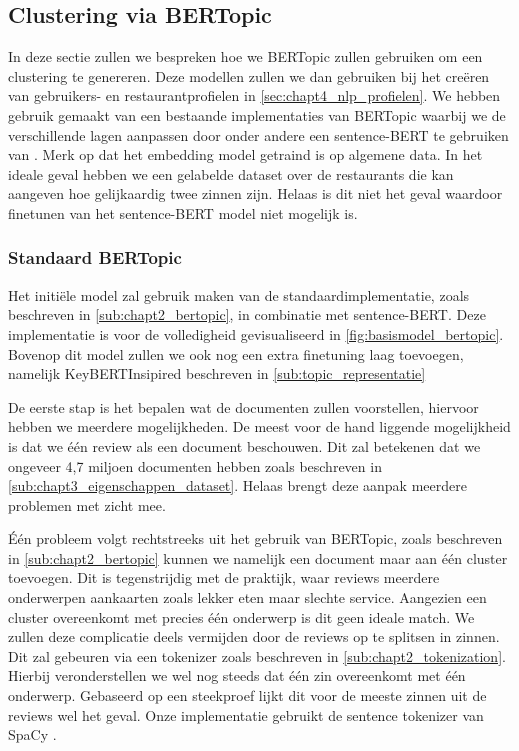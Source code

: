 \subsection{Clustering via BERTopic}
In deze sectie zullen we bespreken hoe we BERTopic zullen gebruiken om een clustering te genereren. Deze modellen zullen we dan gebruiken bij het creëren van gebruikers- en restaurantprofielen in \autoref{sec:chapt4_nlp_profielen}. We hebben gebruik gemaakt van een bestaande implementaties van BERTopic \cite{bertopic_homepage} waarbij we de verschillende lagen aanpassen door onder andere een sentence-BERT te gebruiken van \cite{sentence_transformers_implementation}. Merk op dat het embedding model getraind is op algemene data. In het ideale geval hebben we een gelabelde dataset over de restaurants die kan aangeven hoe gelijkaardig twee zinnen zijn. Helaas is dit niet het geval waardoor finetunen van het sentence-BERT model niet mogelijk is.

\subsubsection{Standaard BERTopic}
Het initiële model zal gebruik maken van de standaardimplementatie, zoals beschreven in \autoref{sub:chapt2_bertopic}, in combinatie met sentence-BERT. Deze implementatie is voor de volledigheid gevisualiseerd in \autoref{fig:basismodel_bertopic}. Bovenop dit model zullen we ook nog een extra finetuning laag toevoegen, namelijk KeyBERTInsipired beschreven in \autoref{sub:topic_representatie}


De eerste stap is het bepalen wat de documenten zullen voorstellen, hiervoor hebben we meerdere mogelijkheden. De meest voor de hand liggende mogelijkheid is dat we één review als een document beschouwen. Dit zal betekenen dat we ongeveer 4,7 miljoen documenten hebben zoals beschreven in \autoref{sub:chapt3_eigenschappen_dataset}. Helaas brengt deze aanpak meerdere problemen met zicht mee. 

Één probleem volgt rechtstreeks uit het gebruik van BERTopic, zoals beschreven in \autoref{sub:chapt2_bertopic} kunnen we namelijk een document maar aan één cluster toevoegen. Dit is tegenstrijdig met de praktijk, waar reviews meerdere onderwerpen aankaarten zoals lekker eten maar slechte service. Aangezien een cluster overeenkomt met precies één onderwerp is dit geen ideale match. We zullen deze complicatie deels vermijden door de reviews op te splitsen in zinnen. Dit zal gebeuren via een tokenizer zoals beschreven in \autoref{sub:chapt2_tokenization}. Hierbij veronderstellen we wel nog steeds dat één zin overeenkomt met één onderwerp. Gebaseerd op een steekproef lijkt dit voor de meeste zinnen uit de reviews wel het geval. Onze implementatie gebruikt de sentence tokenizer van SpaCy \cite{spacy_main}.

